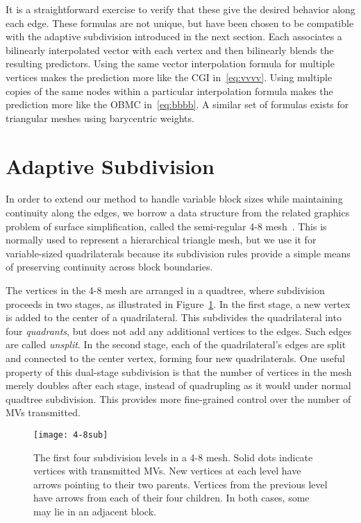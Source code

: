 \documentclass[11pt,letterpaper]{article}
\begin{document}
It is a straightforward exercise to verify that these give the desired behavior
 along each edge.
These formulas are not unique, but have been chosen to be compatible with the
 adaptive subdivision introduced in the next section.
Each associates a bilinearly interpolated vector with each vertex and then
 bilinearly blends the resulting predictors.
Using the same vector interpolation formula for multiple vertices makes the
 prediction more like the CGI in~\eqref{eq:vvvv}.
Using multiple copies of the same nodes within a particular interpolation
 formula makes the prediction more like the OBMC in~\eqref{eq:bbbb}.
A similar set of formulas exists for triangular meshes using barycentric
 weights.

\section{Adaptive Subdivision}
\label{sec:subdiv}

In order to extend our method to handle variable block sizes while maintaining
 continuity along the edges, we borrow a data structure from the related
 graphics problem of surface simplification, called the semi-regular 4-8
 mesh~\cite{VG00,DWSMAM97}.
This is normally used to represent a hierarchical triangle mesh, but we use it
 for variable-sized quadrilaterals because its subdivision rules provide a
 simple means of preserving continuity across block boundaries.

The vertices in the 4-8 mesh are arranged in a quadtree, where subdivision
 proceeds in two stages, as illustrated in Figure~\ref{fig:4-8sub}.
In the first stage, a new vertex is added to the center of a quadrilateral.
This subdivides the quadrilateral into four \textit{quadrants}, but does not
 add any additional vertices to the edges.
Such edges are called \textit{unsplit}.
In the second stage, each of the quadrilateral's edges are split and connected
 to the center vertex, forming four new quadrilaterals.
One useful property of this dual-stage subdivision is that the number of
 vertices in the mesh merely doubles after each stage, instead of quadrupling
 as it would under normal quadtree subdivision.
This provides more fine-grained control over the number of MVs transmitted.

\begin{figure}[tb]
\center
\texttt{[image: 4-8sub]}
\caption{The first four subdivision levels in a 4-8 mesh.
Solid dots indicate vertices with transmitted MVs.
New vertices at each level have arrows pointing to their two parents.
Vertices from the previous level have arrows from each of their four children.
In both cases, some may lie in an adjacent block.}
\label{fig:4-8sub}
\end{figure}
\end{document}
